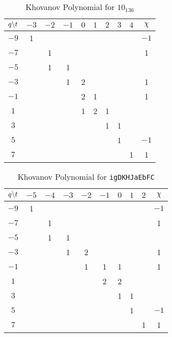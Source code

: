 \documentclass{article}
\theoremstyle{plain}
\begin{document}
        \begin{table}
            \centering
            \begin{tabular}{| c | c | c | c | c | c | c | c | c | c |}
                \hline
                $q\symbol{92}t$&$-3$&$-2$&$-1$&$0$&$1$&$2$&$3$&$4$&$\chi$\\
                \hline
                $-9$&1&&&&&&&&$-1$\\
                \hline
                $-7$&&1&&&&&&&1\\
                \hline
                $-5$&&1&1&&&&&&\\
                \hline
                $-3$&&&1&2&&&&&1\\
                \hline
                $-1$&&&&2&1&&&&1\\
                \hline
                $1$&&&&1&2&1&&&\\
                \hline
                $3$&&&&&&1&1&&\\
                \hline
                $5$&&&&&&&1&&$-1$\\
                \hline
                $7$&&&&&&&&1&1\\
                \hline
            \end{tabular}
            \caption{Khovanov Polynomial for $10_{136}$}
        \end{table}
        \begin{table}
            \centering
            \begin{tabular}{| c | c | c | c | c | c | c | c | c | c |}
                \hline
                $q\symbol{92}t$&$-5$&$-4$&$-3$&$-2$&$-1$&$0$&$1$&$2$&$\chi$\\
                \hline
                $-9$&1&&&&&&&&$-1$\\
                \hline
                $-7$&&1&&&&&&&1\\
                \hline
                $-5$&&1&1&&&&&&\\
                \hline
                $-3$&&&1&2&&&&&1\\
                \hline
                $-1$&&&&1&1&1&&&1\\
                \hline
                $1$&&&&&2&2&&&\\
                \hline
                $3$&&&&&&1&1&&\\
                \hline
                $5$&&&&&&&1&&$-1$\\
                \hline
                $7$&&&&&&&&1&1\\
                \hline
            \end{tabular}
            \caption{Khovanov Polynomial for \texttt{igDKHJaEbFC}}
        \end{table}
\end{document}
